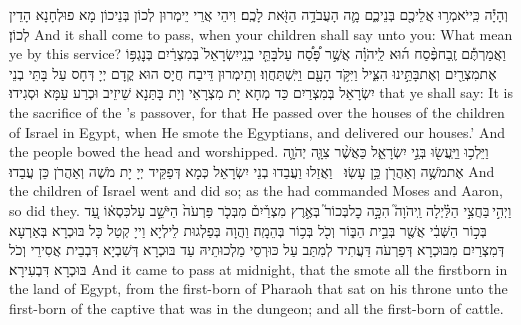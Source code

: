 {וְהָיָ֕ה כִּֽי\maqqaf יֹאמְר֥וּ אֲלֵיכֶ֖ם בְּנֵיכֶ֑ם מָ֛ה הָעֲבֹדָ֥ה הַזֹּ֖את לָכֶֽם׃}
{וִיהֵי אֲרֵי יֵימְרוּן לְכוֹן בְּנֵיכוֹן מָא פוּלְחָנָא הָדֵין לְכוֹן׃}
{And it shall come to pass, when your children shall say unto you: What mean ye by this service?}{}
{וַאֲמַרְתֶּ֡ם זֶֽבַח\maqqaf פֶּ֨סַח ה֜וּא לַֽיהֹוָ֗ה אֲשֶׁ֣ר פָּ֠סַ֠ח עַל\maqqaf בָּתֵּ֤י בְנֵֽי\maqqaf יִשְׂרָאֵל֙ בְּמִצְרַ֔יִם בְּנׇגְפּ֥וֹ אֶת\maqqaf מִצְרַ֖יִם וְאֶת\maqqaf בָּתֵּ֣ינוּ הִצִּ֑יל וַיִּקֹּ֥ד הָעָ֖ם וַיִּֽשְׁתַּחֲוֽוּ׃}
{וְתֵימְרוּן דֵּיבַח חֲיָס הוּא קֳדָם יְיָ דְּחָס עַל בָּתֵּי בְנֵי יִשְׂרָאֵל בְּמִצְרַיִם כַּד מְחָא יָת מִצְרָאֵי וְיָת בָּתַּנָא שֵׁיזֵיב וּכְרַע עַמָּא וּסְגִידוּ׃}
{that ye shall say: It is the sacrifice of the \lord’s passover, for that He passed over the houses of the children of Israel in Egypt, when He smote the Egyptians, and delivered our houses.’ And the people bowed the head and worshipped.}{}
{וַיֵּלְכ֥וּ וַיַּֽעֲשׂ֖וּ בְּנֵ֣י יִשְׂרָאֵ֑ל כַּאֲשֶׁ֨ר צִוָּ֧ה יְהֹוָ֛ה אֶת\maqqaf מֹשֶׁ֥ה וְאַהֲרֹ֖ן כֵּ֥ן עָשֽׂוּ׃ \setuma }
{וַאֲזַלוּ וַעֲבַדוּ בְנֵי יִשְׂרָאֵל כְּמָא דְּפַקֵּיד יְיָ יָת מֹשֶׁה וְאַהֲרֹן כֵּן עֲבַדוּ׃}
{And the children of Israel went and did so; as the \lord\space had commanded Moses and Aaron, so did they.}{}
{וַיְהִ֣י \legarmeh  בַּחֲצִ֣י הַלַּ֗יְלָה וַֽיהֹוָה֮ הִכָּ֣ה כׇל\maqqaf בְּכוֹר֮ בְּאֶ֣רֶץ מִצְרַ֒יִם֒ מִבְּכֹ֤ר פַּרְעֹה֙ הַיֹּשֵׁ֣ב עַל\maqqaf כִּסְא֔וֹ עַ֚ד בְּכ֣וֹר הַשְּׁבִ֔י אֲשֶׁ֖ר בְּבֵ֣ית הַבּ֑וֹר וְכֹ֖ל בְּכ֥וֹר בְּהֵמָֽה׃}
{וַהֲוָה בְּפַלְגוּת לֵילְיָא וַייָ קְטַל כָּל בּוּכְרָא בְּאַרְעָא דְּמִצְרַיִם מִבּוּכְרָא דְּפַרְעֹה דַּעֲתִיד לְמִתַּב עַל כּוּרְסֵי מַלְכוּתֵיהּ עַד בּוּכְרָא דְּשִׁבְיָא דִּבְבֵית אֲסִירֵי וְכֹל בּוּכְרָא דִּבְעִירָא׃}
{And it came to pass at midnight, that the \lord\space smote all the firstborn in the land of Egypt, from the first-born of Pharaoh that sat on his throne unto the first-born of the captive that was in the dungeon; and all the first-born of cattle.}{}
